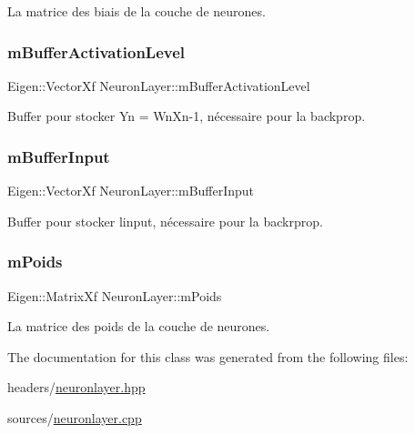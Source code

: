 La matrice des biais de la couche de neurones. 

\mbox{\label{classNeuronLayer_a5b5ccadbab1d38fd3b09fcab7dc01148}} 
\subsubsection{\texorpdfstring{m\+Buffer\+Activation\+Level}{mBufferActivationLevel}}
{\footnotesize\ttfamily Eigen\+::\+Vector\+Xf Neuron\+Layer\+::m\+Buffer\+Activation\+Level\hspace{0.3cm}{\ttfamily [private]}}



Buffer pour stocker Yn = Wn\+Xn-\/1, nécessaire pour la backprop. 

\mbox{\label{classNeuronLayer_ab5a3fc010c33628e37b5a19d370978e9}} 
\subsubsection{\texorpdfstring{m\+Buffer\+Input}{mBufferInput}}
{\footnotesize\ttfamily Eigen\+::\+Vector\+Xf Neuron\+Layer\+::m\+Buffer\+Input\hspace{0.3cm}{\ttfamily [private]}}



Buffer pour stocker l\textquotesingle{}input, nécessaire pour la backrprop. 

\mbox{\label{classNeuronLayer_ab6aaf5dc22c97ba46db5ac5e8715ed8f}} 
\subsubsection{\texorpdfstring{m\+Poids}{mPoids}}
{\footnotesize\ttfamily Eigen\+::\+Matrix\+Xf Neuron\+Layer\+::m\+Poids\hspace{0.3cm}{\ttfamily [private]}}



La matrice des poids de la couche de neurones. 



The documentation for this class was generated from the following files\+:\begin{DoxyCompactItemize}
\item 
headers/\hyperlink{neuronlayer_8hpp}{neuronlayer.\+hpp}\item 
sources/\hyperlink{neuronlayer_8cpp}{neuronlayer.\+cpp}\end{DoxyCompactItemize}
